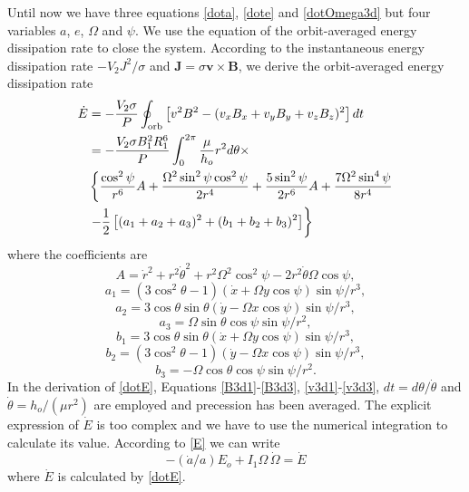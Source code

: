\documentclass[twocolumn,linenumbers]{aastex631}
\begin{document}
Until now we have three equations \eqref{dota}, \eqref{dote} and \eqref{dotOmega3d} but four variables $a$, $e$, $\Omega$ and $\psi$. We use the equation of the orbit-averaged energy dissipation rate to close the system. According to the instantaneous energy dissipation rate $-V_2J^2/\sigma$ and $\bm J=\sigma\bm v\times\bm B$, we derive the orbit-averaged energy dissipation rate
\begin{align}\label{dotE}
\dot E & =-\frac{V_2\sigma}{P}\oint_{\rm orb}\left[v^2B^2-(v_xB_x+v_yB_y+v_zB_z)^2\right]dt \nonumber \\
& =-\frac{V_2\sigma B_1^2R_1^6}{P}\int_0^{2\pi}\frac{\mu}{h_o}r^2d\theta\times \nonumber \\
& \left\{\frac{\cos^2\psi}{r^6}A+\frac{\Omega^2\sin^2\psi\cos^2\psi}{2r^4}+\frac{5\sin^2\psi}{2r^6}A+\frac{7\Omega^2\sin^4\psi}{8r^4}\right. \nonumber \\
& \left. -\frac{1}{2}\left[(a_1+a_2+a_3)^2+(b_1+b_2+b_3)^2\right]\right\}
\end{align}
where the coefficients are
\begin{equation}
A={\dot r}^2+r^2{\dot\theta}^2+r^2\Omega^2\cos^2\psi-2r^2\dot\theta\Omega\cos\psi, 
\end{equation}
\begin{equation}
a_1=(3\cos^2\theta-1)(\dot x+\Omega y\cos\psi)\sin\psi/r^3,  
\end{equation}
\begin{equation}
a_2=3\cos\theta\sin\theta(\dot y-\Omega x\cos\psi)\sin\psi/r^3,  
\end{equation}
\begin{equation}
a_3=\Omega\sin\theta\cos\psi\sin\psi/r^2,  
\end{equation}
\begin{equation}
b_1=3\cos\theta\sin\theta(\dot x+\Omega y\cos\psi)\sin\psi/r^3,  
\end{equation}
\begin{equation}
b_2=(3\cos^2\theta-1)(\dot y-\Omega x\cos\psi)\sin\psi/r^3,  
\end{equation}
\begin{equation}
b_3=-\Omega\cos\theta\cos\psi\sin\psi/r^2.
\end{equation}
In the derivation of \eqref{dotE}, Equations \eqref{B3d1}-\eqref{B3d3}, \eqref{v3d1}-\eqref{v3d3}, $dt=d\theta/\dot\theta$ and $\dot\theta=h_o/(\mu r^2)$ are employed and precession has been averaged. The explicit expression of $\dot E$ is too complex and we have to use the numerical integration to calculate its value. According to \eqref{E} we can write 
\begin{equation}\label{close}
-(\dot a/a)E_o+I_1\Omega\,\dot\Omega=\dot E
\end{equation}
where $\dot E$ is calculated by \eqref{dotE}.
\end{document}
